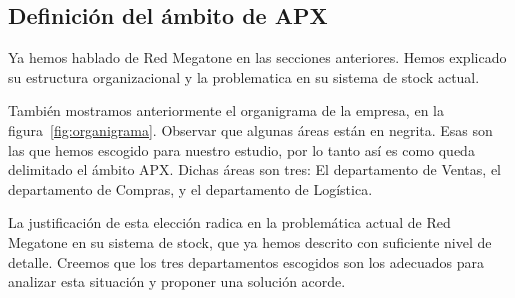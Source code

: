 \subsection{Definición del ámbito de APX}

Ya hemos hablado de Red Megatone en las secciones anteriores. Hemos explicado
su estructura organizacional y la problematica en su sistema de stock actual.

También mostramos anteriormente el organigrama de la empresa, en la
figura~\ref{fig:organigrama}. Observar que algunas áreas están en negrita. Esas
son las que hemos escogido para nuestro estudio, por lo tanto así es como queda
delimitado el ámbito APX. Dichas áreas son tres: El departamento de Ventas, el
departamento de Compras, y el departamento de Logística.

La justificación de esta elección radica en la problemática actual de Red
Megatone en su sistema de stock, que ya hemos descrito con suficiente nivel de
detalle. Creemos que los tres departamentos escogidos son los adecuados para
analizar esta situación y proponer una solución acorde.

